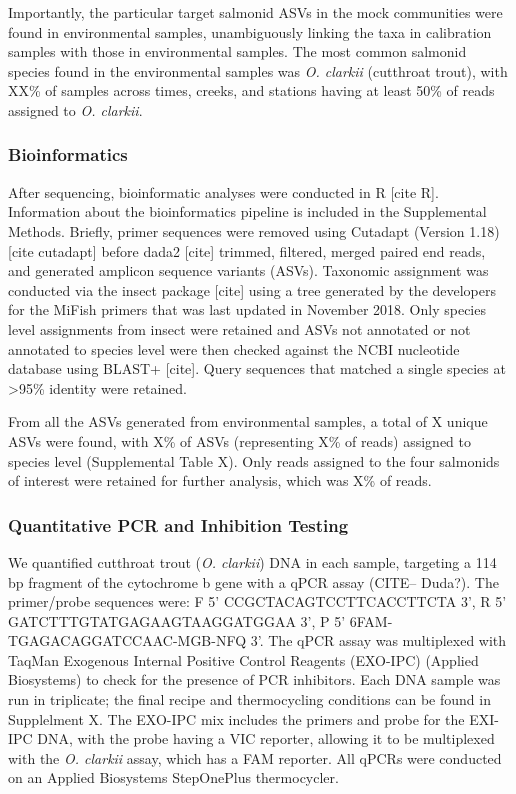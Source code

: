 \documentclass[
]{article}
\begin{document}
Importantly, the particular target salmonid ASVs in the mock communities
were found in environmental samples, unambiguously linking the taxa in
calibration samples with those in environmental samples. The most common
salmonid species found in the environmental samples was \emph{O.
clarkii} (cutthroat trout), with XX\% of samples across times, creeks,
and stations having at least 50\% of reads assigned to \emph{O.
clarkii}.

\hypertarget{bioinformatics}{%
\subsubsection{Bioinformatics}\label{bioinformatics}}

After sequencing, bioinformatic analyses were conducted in R {[}cite
R{]}. Information about the bioinformatics pipeline is included in the
Supplemental Methods. Briefly, primer sequences were removed using
Cutadapt (Version 1.18) {[}cite cutadapt{]} before dada2 {[}cite{]}
trimmed, filtered, merged paired end reads, and generated amplicon
sequence variants (ASVs). Taxonomic assignment was conducted via the
insect package {[}cite{]} using a tree generated by the developers for
the MiFish primers that was last updated in November 2018. Only species
level assignments from insect were retained and ASVs not annotated or
not annotated to species level were then checked against the NCBI
nucleotide database using BLAST+ {[}cite{]}. Query sequences that
matched a single species at \textgreater95\% identity were retained.

From all the ASVs generated from environmental samples, a total of X
unique ASVs were found, with X\% of ASVs (representing X\% of reads)
assigned to species level (Supplemental Table X). Only reads assigned to
the four salmonids of interest were retained for further analysis, which
was X\% of reads.

\hypertarget{quantitative-pcr-and-inhibition-testing}{%
\subsubsection{Quantitative PCR and Inhibition
Testing}\label{quantitative-pcr-and-inhibition-testing}}

We quantified cutthroat trout (\emph{O. clarkii}) DNA in each sample,
targeting a 114 bp fragment of the cytochrome b gene with a qPCR assay
(CITE-- Duda?). The primer/probe sequences were: F 5'
CCGCTACAGTCCTTCACCTTCTA 3', R 5' GATCTTTGTATGAGAAGTAAGGATGGAA 3', P 5'
6FAM-TGAGACAGGATCCAAC-MGB-NFQ 3'. The qPCR assay was multiplexed with
TaqMan Exogenous Internal Positive Control Reagents (EXO-IPC) (Applied
Biosystems) to check for the presence of PCR inhibitors. Each DNA sample
was run in triplicate; the final recipe and thermocycling conditions can
be found in Supplelment X. The EXO-IPC mix includes the primers and
probe for the EXI-IPC DNA, with the probe having a VIC reporter,
allowing it to be multiplexed with the \emph{O. clarkii} assay, which
has a FAM reporter. All qPCRs were conducted on an Applied Biosystems
StepOnePlus thermocycler.
\end{document}
